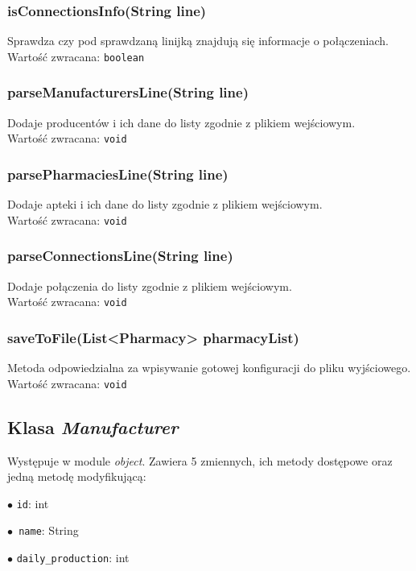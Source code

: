 \documentclass[]{article}
\begin{document}
    \subsubsection{isConnectionsInfo(String line)}
    Sprawdza czy pod sprawdzaną linijką znajdują się informacje o połączeniach.\\
    Wartość zwracana: \verb|boolean|

    \subsubsection{parseManufacturersLine(String line)}
    Dodaje producentów i ich dane do listy zgodnie z plikiem wejściowym.\\
    Wartość zwracana: \verb|void|

    \subsubsection{parsePharmaciesLine(String line)}
    Dodaje apteki i ich dane do listy zgodnie z plikiem wejściowym.\\
    Wartość zwracana: \verb|void|

    \subsubsection{parseConnectionsLine(String line)}
    Dodaje połączenia do listy zgodnie z plikiem wejściowym.\\
    Wartość zwracana: \verb|void|

    \subsubsection{saveToFile(List<Pharmacy> pharmacyList)}
    Metoda odpowiedzialna za wpisywanie gotowej konfiguracji do pliku wyjściowego.\\
    Wartość zwracana: \verb|void|

    \subsection{Klasa \textit{Manufacturer}}
    Występuje w module \textit{object}.
    Zawiera 5 zmiennych, ich metody dostępowe oraz jedną metodę modyfikującą:

    $\bullet$ \verb|id|: int

    $\bullet$\verb| name|: String

    $\bullet$ \verb|daily_production|: int
\end{document}
